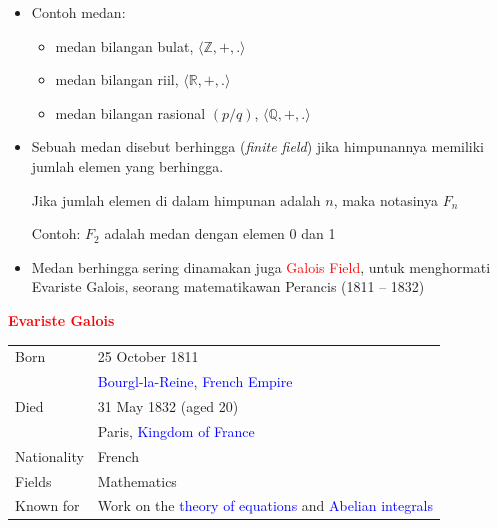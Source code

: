 \documentclass{article}
\begin{document}
\begin{itemize}
    \item Contoh medan:
    \begin{itemize}
        \item medan bilangan bulat, $\langle\mathbb{Z}, +, .\rangle$
        \item medan bilangan riil, $\langle\mathbb{R}, +, .\rangle$
        \item medan bilangan rasional $(p/q)$, $\langle\mathbb{Q}, +, .\rangle$
    \end{itemize}

    \item Sebuah medan disebut berhingga (\textit{finite field}) jika himpunannya memiliki jumlah elemen yang berhingga.
    
    Jika jumlah elemen di dalam himpunan adalah $n$, maka notasinya $F_n$
    
    Contoh: $F_2$ adalah medan dengan elemen 0 dan 1

    \item Medan berhingga sering dinamakan juga \textcolor{red}{Galois Field}, untuk menghormati Evariste Galois, seorang matematikawan Perancis (1811 -- 1832)
\end{itemize}

\newpage


\vspace{238.79mm}

\begin{center}\textcolor{red}{\textbf{Evariste Galois}}\end{center}

\vspace{60mm}

\begin{tabular}{ll}
Born & 25 October 1811 \\
& \textcolor{blue}{Bourgl-la-Reine}, \textcolor{blue}{French Empire} \\
\addlinespace[2mm]
Died & 31 May 1832 (aged 20) \\
& Paris, \textcolor{blue}{Kingdom of France} \\
\addlinespace[2mm]
Nationality & French \\
\addlinespace[2mm]
Fields & Mathematics \\
\addlinespace[2mm]
Known for & Work on the \textcolor{blue}{theory of equations} and \textcolor{blue}{Abelian integrals}
\end{tabular}
\end{document}
